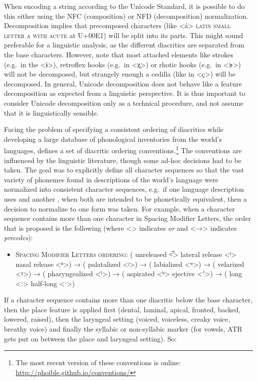 When encoding a string according to the Unicode Standard, it is possible to do
this either using the NFC (composition) or NFD (decomposition) normalization.
Decomposition implies that precomposed characters (like <á> \textsc{latin small
letter a with acute} at U+00E1) will be split into its parts. This might sound
preferable for a linguistic analysis, as the different diacritics are separated
from the base characters. However, note that most attached elements like strokes
(e.g.~in the <ɨ>), retroflex hooks (e.g.~in <ʐ>) or rhotic hooks (e.g.~in <ɝ>)
will not be decomposed, but strangely enough a cedilla (like in <ç>) will be
decomposed. In general, Unicode decomposition does not behave like a feature
decomposition as expected from a linguistic perspective. It is thus important to
consider Unicode decomposition only as a technical procedure, and not assume
that it is linguistically sensible.

Facing the problem of specifying a consistent ordering of diacritics while
developing a large database of phonological inventories from the world's
languages, \citet[540]{Moran2012} defines a set of diacritic ordering
conventions.\footnote{The most recent version of these conventions is online:
\url{http://phoible.github.io/conventions/}} The conventions are influenced by
the linguistic literature, though some ad-hoc decisions had to be taken. The
goal was to explicitly define all character sequences so that the vast variety
of phonemes found in descriptions of the world's language were normalized into
consistent character sequences, e.g.~if one language description uses and
another , when both are intended to be phonetically equivalent, then a decision
to normalize to one form was taken. For example, when a character sequence
contains more than one character in Spacing Modifier Letters, the order that is
proposed is the following (where <\textbar{}> indicates \textit{or} and <→>
indicates \textit{precedes}):

\begin{itemize}
	\itemsep1pt\parskip0pt \item \textsc{Spacing Modifier Letters
	ordering:} ( unreleased <̚> \textbar{} lateral release <ˡ> \textbar{}
	nasal release <ⁿ>) → ( palatalized <ʲ>) → ( labialized <ʷ>) → (
	velarized <ˠ>) → ( pharyngealized <ˤ>) → ( aspirated <ʰ> \textbar{}
	ejective <ʼ>) → ( long <ː> \textbar{} half-long <ˑ>)
\end{itemize}

If a character sequence contains more than one diacritic below the base
character, then the place feature is applied first (dental, laminal, apical,
fronted, backed, lowered, raised), then the laryngeal setting (voiced,
voiceless, creaky voice, breathy voice) and finally the syllabic or non-syllabic
marker (for vowels, ATR gets put on between the place and laryngeal setting).
So:


